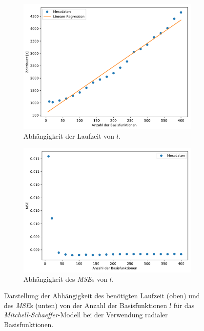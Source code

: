 \begin{appendices}
\begin{figure}[h]
	\centering
	\begin{subfigure}{\textwidth}
		\centering
		\includegraphics[width=4.8in]{figures/results/cross_prediction/rbf_placements_vh_time.pdf}
		\caption{Abhängigkeit der Laufzeit von $l$.}
	\end{subfigure}
	\begin{subfigure}{\textwidth}
		\centering
		\includegraphics[width=4.8in]{figures/results/cross_prediction/rbf_placements_vh_mse.pdf}
  		\caption{Abhängigkeit des \textit{MSE}s von $l$.}
	\end{subfigure}
	\caption{Darstellung der Abhängigkeit des benötigten Laufzeit (oben) und des \textit{MSE}s (unten) von der Anzahl der Basisfunktionen $l$ für das \textit{Mitchell-Schaeffer}-Modell bei der Verwendung radialer Basisfunktionen.}
	\label{fig:apx_exp_cross_rbf_placements_time_mse_ms}
\end{figure}


\end{appendices}
